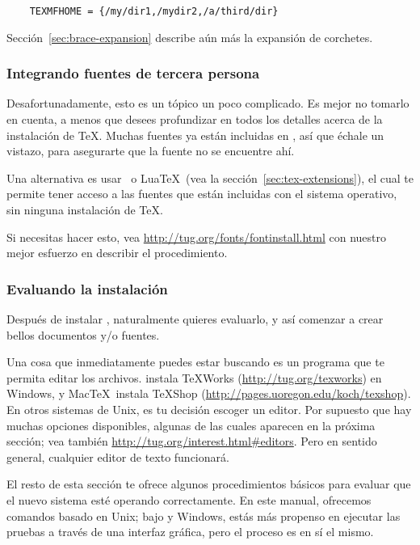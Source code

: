 \documentclass{article}
\begin{document}
\begin{verbatim}
	TEXMFHOME = {/my/dir1,/mydir2,/a/third/dir}
\end{verbatim}

Sección~\ref{sec:brace-expansion} describe aún más la expansión de corchetes. 

\subsubsection{Integrando fuentes de tercera persona}

Desafortunadamente, esto es un tópico un poco complicado. Es mejor no
tomarlo en cuenta, a menos que desees profundizar en todos los
detalles acerca de la instalación de \TeX{}. Muchas fuentes ya están
incluidas en \TL, así que échale un vistazo, para asegurarte que la
fuente no se encuentre ahí.

Una alternativa es usar \XeTeX\ o Lua\TeX\ (vea la
sección~\ref{sec:tex-extensions}), el cual te permite tener acceso a
las fuentes que están incluidas con el sistema operativo, sin ninguna
instalación de \TeX. 

Si necesitas hacer esto, vea
\url{http://tug.org/fonts/fontinstall.html} con nuestro mejor esfuerzo
en describir el procedimiento. 

\subsubsection{Evaluando la instalación}
\label{sec:test-install}

Después de instalar \TL{}, naturalmente quieres evaluarlo, y así
comenzar a crear bellos documentos y\slash o fuentes. 

Una cosa que inmediatamente puedes estar buscando es un programa que te
permita editar los archivos. \TL{} instala \TeX{}Works
(\url{http://tug.org/texworks}) en Windows, y Mac\TeX\ instala TeXShop
(\url{http://pages.uoregon.edu/koch/texshop}). En otros sistemas de
Unix, es tu decisión escoger un editor. Por supuesto que hay muchas
opciones disponibles, algunas de las cuales aparecen en la próxima
sección; vea también \url{http://tug.org/interest.html#editors}. Pero
en sentido general, cualquier editor de texto funcionará.

El resto de esta sección te ofrece algunos procedimientos básicos para
evaluar que el nuevo sistema esté operando correctamente. En este
manual, ofrecemos comandos basado en Unix; bajo \MacOSX{} y Windows, estás
más propenso en ejecutar las pruebas a través de una interfaz gráfica,
pero el proceso es en sí el mismo. 
\end{document}
